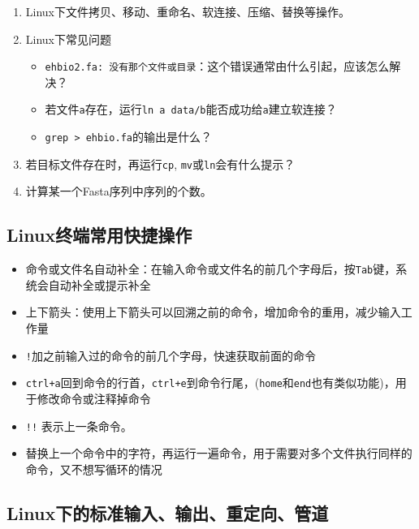 \documentclass[]{article}
\providecommand{\tightlist}{%
  \setlength{\itemsep}{0pt}\setlength{\parskip}{0pt}}
\numberwithin{figure}{section}
\numberwithin{table}{section}
\begin{document}
\begin{enumerate}
\def\labelenumi{\arabic{enumi}.}
\tightlist
\item
  Linux下文件拷贝、移动、重命名、软连接、压缩、替换等操作。
\item
  Linux下常见问题

  \begin{itemize}
  \tightlist
  \item
    \texttt{ehbio2.fa:\ 没有那个文件或目录}：这个错误通常由什么引起，应该怎么解决？
  \item
    若文件\texttt{a}存在，运行\texttt{ln\ a\ data/b}能否成功给\texttt{a}建立软连接？
  \item
    \texttt{grep\ \textquotesingle{}\textgreater{}\ ehbio.fa}的输出是什么？
  \end{itemize}
\item
  若目标文件存在时，再运行\texttt{cp}, \texttt{mv}或\texttt{ln}会有什么提示？
\item
  计算某一个Fasta序列中序列的个数。
\end{enumerate}

\hypertarget{shortcut}{%
\subsection{Linux终端常用快捷操作}\label{shortcut}}

\begin{itemize}
\item
  命令或文件名自动补全：在输入命令或文件名的前几个字母后，按\texttt{Tab}键，系统会自动补全或提示补全
\item
  上下箭头：使用上下箭头可以回溯之前的命令，增加命令的重用，减少输入工作量
\item
  \texttt{!}加之前输入过的命令的前几个字母，快速获取前面的命令
\item
  \texttt{ctrl+a}回到命令的行首，\texttt{ctrl+e}到命令行尾，(\texttt{home}和\texttt{end}也有类似功能)，用于修改命令或注释掉命令
\item
  \texttt{!!} 表示上一条命令。
\item
  替换上一个命令中的字符，再运行一遍命令，用于需要对多个文件执行同样的命令，又不想写循环的情况
\end{itemize}

\hypertarget{stdinoutpipe}{%
\subsection{Linux下的标准输入、输出、重定向、管道}\label{stdinoutpipe}}
\end{document}
